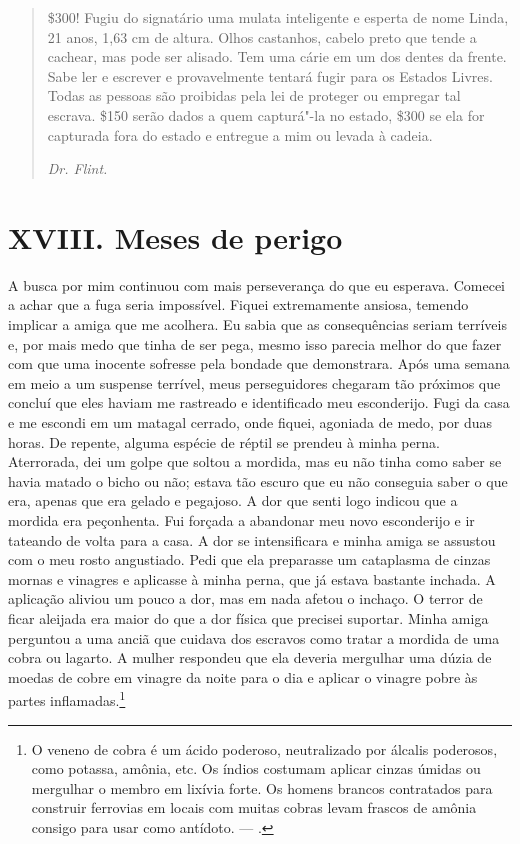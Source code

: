 \begin{quote}
 \$300! Fugiu do signatário
uma mulata inteligente e esperta de nome Linda, 21 anos, 1,63 cm de
altura. Olhos castanhos, cabelo preto que tende a cachear, mas pode ser
alisado. Tem uma cárie em um dos dentes da frente. Sabe ler e escrever e
provavelmente tentará fugir para os Estados Livres. Todas as pessoas são
proibidas pela lei de proteger ou empregar tal escrava. \$150 serão
dados a quem capturá"-la no estado, \$300 se ela for capturada fora do
estado e entregue a mim ou levada à cadeia.

\begin{flushright}
\emph{Dr. Flint.}
\end{flushright}
\end{quote}

\chapter{XVIII. Meses de perigo}

A busca por mim continuou com mais
perseverança do que eu esperava. Comecei a achar que a fuga seria
impossível. Fiquei extremamente ansiosa, temendo implicar a amiga que me
acolhera. Eu sabia que as consequências seriam terríveis e, por mais
medo que tinha de ser pega, mesmo isso parecia melhor do que fazer com
que uma inocente sofresse pela bondade que demonstrara. Após uma semana
em meio a um suspense terrível, meus perseguidores chegaram tão próximos
que concluí que eles haviam me rastreado e identificado meu esconderijo.
Fugi da casa e me escondi em um matagal cerrado, onde fiquei, agoniada
de medo, por duas horas. De repente, alguma espécie de réptil se prendeu
à minha perna. Aterrorada, dei um golpe que soltou a mordida, mas eu não
tinha como saber se havia matado o bicho ou não; estava tão escuro que
eu não conseguia saber o que era, apenas que era gelado e pegajoso. A
dor que senti logo indicou que a mordida era peçonhenta. Fui forçada a
abandonar meu novo esconderijo e ir tateando de volta para a casa. A dor
se intensificara e minha amiga se assustou com o meu rosto angustiado.
Pedi que ela preparasse um cataplasma de cinzas mornas e vinagres e
aplicasse à minha perna, que já estava bastante inchada. A aplicação
aliviou um pouco a dor, mas em nada afetou o inchaço. O terror de ficar
aleijada era maior do que a dor física que precisei suportar. Minha
amiga perguntou a uma anciã que cuidava dos escravos como tratar a
mordida de uma cobra ou lagarto. A mulher respondeu que ela deveria
mergulhar uma dúzia de moedas de cobre em vinagre da noite para o dia e
aplicar o vinagre pobre às partes inflamadas.\footnote{O veneno de cobra
é um ácido poderoso, neutralizado por álcalis poderosos, como potassa,
amônia, etc. Os índios costumam aplicar cinzas úmidas ou mergulhar o
membro em lixívia forte. Os homens brancos contratados para construir
ferrovias em locais com muitas cobras levam frascos de amônia consigo
para usar como antídoto. --- .}


